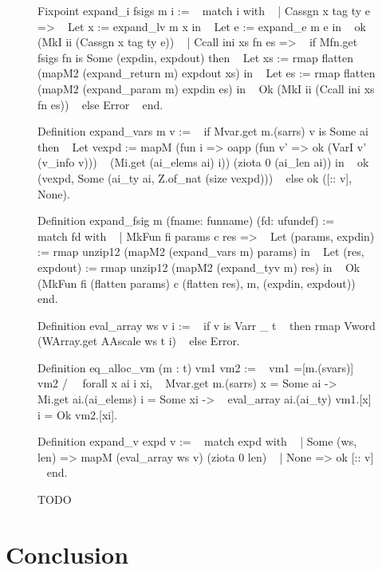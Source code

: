 \documentclass{article}
\begin{document}
\begin{figure}
Fixpoint expand\_i fsigs m i :=
~ match i with
~ | Cassgn x tag ty e =>
~   Let x := expand\_lv m x in
~   Let e := expand\_e m e in
~   ok (MkI ii (Cassgn x tag ty e))
~ | Ccall ini xs fn es =>
~   if Mfn.get fsigs fn is Some (expdin, expdout) then
~     Let xs := rmap flatten (mapM2 (expand\_return m) expdout xs) in
~     Let es := rmap flatten (mapM2 (expand\_param m) expdin es) in
~     Ok (MkI ii (Ccall ini xs fn es))
~   else Error
~ end.

Definition expand\_vars m v :=
~ if Mvar.get m.(sarrs) v is Some ai then
~   Let vexpd := mapM (fun i => oapp (fun v' => ok (VarI v' (v\_info v)))
~     (Mi.get (ai\_elems ai) i)) (ziota 0 (ai\_len ai)) in
~   ok (vexpd, Some (ai\_ty ai, Z.of\_nat (size vexpd)))
~ else ok ([:: v], None).

Definition expand\_fsig m (fname: funname) (fd: ufundef) :=
~ match fd with
~ | MkFun fi params c res =>
~   Let (params, expdin) := rmap unzip12 (mapM2 (expand\_vars m) params) in
~   Let (res, expdout) := rmap unzip12 (mapM2 (expand\_tyv m) res) in
~   Ok (MkFun fi (flatten params) c (flatten res), m, (expdin, expdout))
~ end.

Definition eval\_array ws v i :=
~ if v is Varr \_ t
~ then rmap Vword (WArray.get AAscale ws t i)
~ else Error.

Definition eq\_alloc\_vm (m : t) vm1 vm2 :=
~ vm1 =[m.(svars)] vm2 /\
~ forall x ai i xi,
~   Mvar.get m.(sarrs) x = Some ai ->
~   Mi.get ai.(ai\_elems) i = Some xi ->
~   eval\_array ai.(ai\_ty) vm1.[x] i = Ok vm2.[xi].

Definition expand\_v expd v :=
~ match expd with
~ | Some (ws, len) => mapM (eval\_array ws v) (ziota 0 len)
~ | None => ok [:: v]
~ end.
\normalfont%
\caption{TODO}
\end{figure}



\section{}

\section{Conclusion}
\end{document}
